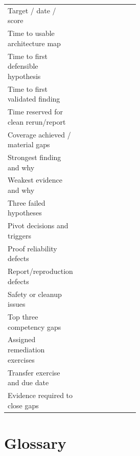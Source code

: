 \documentclass[11pt]{article}
\begin{document}
\begin{tabularx}{\linewidth}{@{}L{0.30\linewidth}Y@{}}
\toprule
Target / date / score & \\
Time to usable architecture map & \\
Time to first defensible hypothesis & \\
Time to first validated finding & \\
Time reserved for clean rerun/report & \\
Coverage achieved / material gaps & \\
Strongest finding and why & \\
Weakest evidence and why & \\
Three failed hypotheses & \\
Pivot decisions and triggers & \\
Proof reliability defects & \\
Report/reproduction defects & \\
Safety or cleanup issues & \\
Top three competency gaps & \\
Assigned remediation exercises & \\
Transfer exercise and due date & \\
Evidence required to close gaps & \\
\bottomrule
\end{tabularx}

\section{Glossary}
\end{document}
